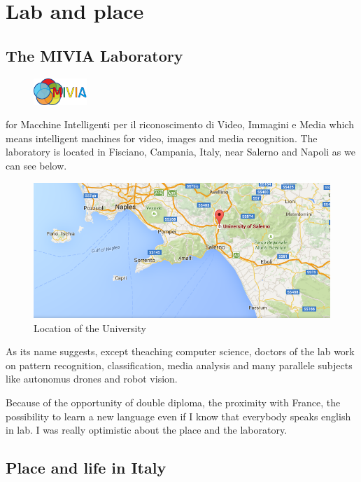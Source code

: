 \chapter{Lab and place}
\section{The MIVIA Laboratory}
\begin{figure}
	\vspace{-7mm}
	\includegraphics[width=2cm]{images_not_compressed/MIVIALogo.jpg}
	\end{figure}
 for Macchine Intelligenti per il riconoscimento di Video, Immagini e Media which means intelligent machines for video, images and media recognition. The laboratory is located in Fisciano, Campania, Italy, near Salerno and Napoli as we can see below.
 \begin{figure}[h]
 \begin{center}
	 \includegraphics[width=12cm]{images_not_compressed/geoUniversity.png}
		\caption{Location of the University}
	 \end{center}
 \end{figure}
 \par As its name suggests, except theaching computer science, doctors of the lab work on pattern recognition, classification, media analysis and many parallele subjects like autonomus drones and robot vision.
 \par Because of the opportunity of double diploma, the proximity with France, the possibility to learn a new language even if I know that everybody speaks english in lab. I was really optimistic about the place and the laboratory.
 
 \section{Place and life in Italy}
 
